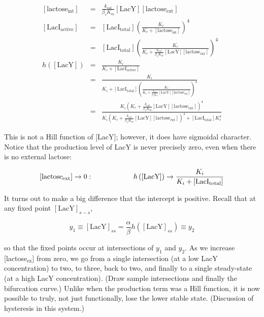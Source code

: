 \documentclass{article}
\begin{document}
 \begin{eqnarray*}
 \left[ \textrm{lactose}_{\textrm{int}} \right] & = & \frac{k_{\textrm{cat}}}{\beta_s K_m} \left[ \textrm{LacY} \right]  \left[ \textrm{lactose}_{\textrm{ext}} \right]\\
 \left[\textrm{LacI}_{\textrm{active}} \right] & = & \left[\textrm{LacI}_{\textrm{total}} \right] \left( \frac{K_r}{K_r + \left[ \textrm{lactose}_{\textrm{int}} \right]} \right)^4\\
& = &  \left[\textrm{LacI}_{\textrm{total}} \right] \left( \frac{K_r}{K_r + \frac{k_{\textrm{cat}}}{\beta_s K_m} \left[ \textrm{LacY} \right]  \left[ \textrm{lactose}_{\textrm{ext}}  \right]} \right)^4\\
h \left( \left[ \textrm{LacY} \right] \right) & = & \frac{K_i}{K_i + \left[\textrm{LacI}_{\textrm{active}} \right]}\\
& = & \frac{K_i}{K_i + \left[\textrm{LacI}_{\textrm{total}} \right] \left( \frac{K_r}{K_r + \frac{k_{\textrm{cat}}}{\beta_s K_m} \left[ \textrm{LacY} \right]  \left[ \textrm{lactose}_{\textrm{ext}}  \right]} \right)^4}\\
& = & \frac{K_i \left( K_r + \frac{k_{\textrm{cat}}}{\beta_s K_m} \left[ \textrm{LacY} \right]  \left[ \textrm{lactose}_{\textrm{ext}}  \right] \right)^4}{K_i \left( K_r + \frac{k_{\textrm{cat}}}{\beta_s K_m} \left[ \textrm{LacY} \right]  \left[ \textrm{lactose}_{\textrm{ext}}  \right] \right)^4 + \left[\textrm{LacI}_{\textrm{total}} \right] K_r^4  }
 \end{eqnarray*}

This is not a Hill function of [LacY]; however, it does have sigmoidal character. Notice that the production level of LacY is never precisely zero, even when there is no external lactose:

\[ \left[ \textrm{lactose}_{\textrm{ext}}  \right] \to 0: \hspace{2 cm} h\left(  \left[\textrm{LacY}\right] \right) \to  \frac{K_i}{K_i + \left[\textrm{LacI}_{\textrm{total}} \right]} \]

It turns out to make a big difference that the intercept is positive. Recall that at any fixed point $ \left[\textrm{LacY}\right]_{s-s}$,

\[  y_1 \equiv \left[ \textrm{LacY} \right]_{ss} = \frac{\alpha}{\beta} h \left( \left[\textrm{LacY}\right]_{ss} \right) \equiv y_2 \]

so that the fixed points occur at intersections of $y_1$ and $y_2$. As we increase [lactose$_{\textrm{ex}}$] from zero, we go from a single intersection (at a low LacY concentration) to two, to three, back to two, and finally to a single steady-state (at a high LacY concentration).  (Draw sample intersections and finally the bifurcation curve.) Unlike when the production term was a Hill function, it is now possible to truly, not just functionally, lose the lower stable state. (Discussion of hysteresis in this system.)\\
\end{document}
